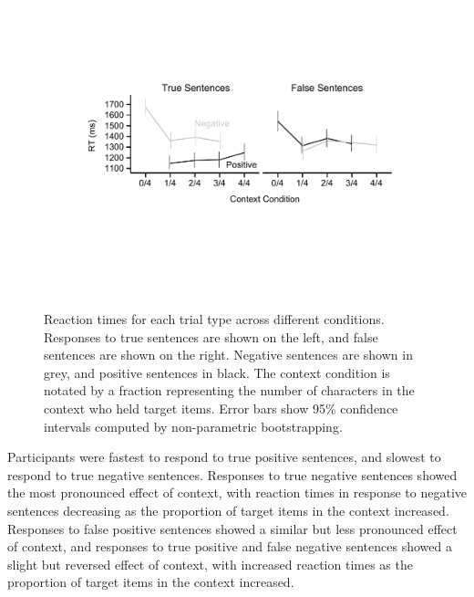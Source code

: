 \documentclass[man]{apa2}
\begin{document}
\begin{figure}[t]
\begin{center} 
\includegraphics[width=6in]{figures/rts.pdf}
\caption{\label{fig:e2line} Reaction times for each trial type across different conditions. Responses to true sentences are shown on the left, and false sentences are shown on the right.  Negative sentences are shown in grey, and positive sentences in black.  The context condition is notated by a fraction representing the number of characters in the context who held target items. Error bars show 95\% confidence intervals computed by non-parametric bootstrapping.  }
\end{center} 
\end{figure}

Participants were fastest to respond to true positive sentences, and slowest to respond to true negative sentences.  Responses to true negative sentences showed the most pronounced effect of context, with reaction times in response to negative sentences decreasing as the proportion of target items in the context increased.  Responses to false positive sentences showed a similar but less pronounced effect of context, and responses to true positive and false negative sentences showed a slight but reversed effect of context, with increased reaction times as the proportion of target items in the context increased.  
\end{document}
